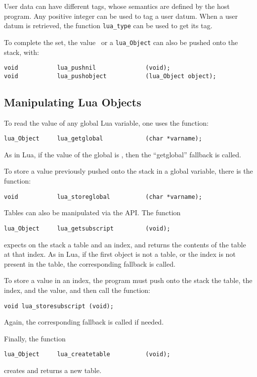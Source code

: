 User data can have different tags,
whose semantics are defined by the host program.
Any positive integer can be used to tag a user datum.
When a user datum is retrieved,
the function \verb'lua_type' can be used to get its tag.

To complete the set,
the value \nil\ or a \verb'lua_Object' can also be pushed onto the stack,
with:
\begin{verbatim}
void           lua_pushnil              (void);
void           lua_pushobject           (lua_Object object);
\end{verbatim}


\subsection{Manipulating Lua Objects}
To read the value of any global Lua variable,
one uses the function:
\begin{verbatim}
lua_Object     lua_getglobal            (char *varname);
\end{verbatim}
As in Lua, if the value of the global is \nil,
then the ``getglobal'' fallback is called.

To store a value previously pushed onto the stack in a global variable,
there is the function:
\begin{verbatim}
void           lua_storeglobal          (char *varname);
\end{verbatim}

Tables can also be manipulated via the API.
The function
\begin{verbatim}
lua_Object     lua_getsubscript         (void);
\end{verbatim}
expects on the stack a table and an index,
and returns the contents of the table at that index.
As in Lua, if the first object is not a table,
or the index is not present in the table,
the corresponding fallback is called.

To store a value in an index,
the program must push onto the stack the table, the index,
and the value,
and then call the function:
\begin{verbatim}
void lua_storesubscript (void);
\end{verbatim}
Again, the corresponding fallback is called if needed.

Finally, the function
\begin{verbatim}
lua_Object     lua_createtable          (void);
\end{verbatim}
creates and returns a new table.

